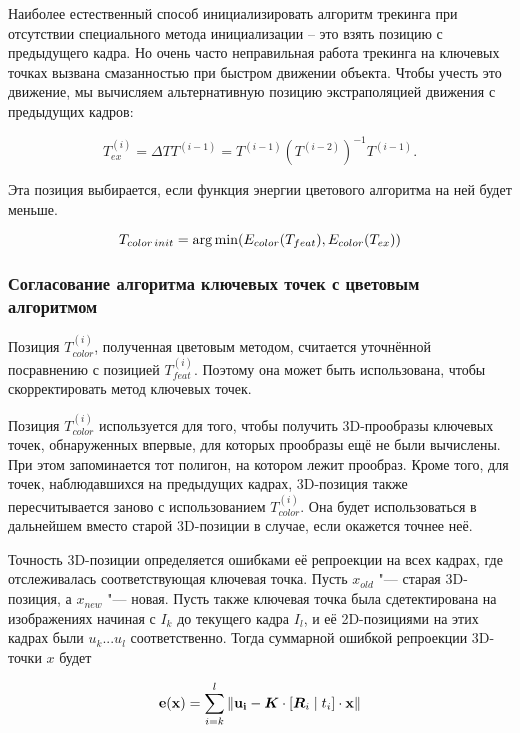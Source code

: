 Наиболее естественный способ инициализировать алгоритм трекинга при отсутствии
специального метода инициализации -- это взять позицию с предыдущего кадра.
Но очень часто неправильная работа трекинга на ключевых точках вызвана
смазанностью при быстром движении объекта.
Чтобы учесть это движение, мы вычисляем альтернативную позицию экстраполяцией
движения с предыдущих кадров:

\begin{equation}
\label{eqn:extrapolation}
T^{(i)}_{ex} = \Delta T T^{(i - 1)} = T^{(i - 1)}(T^{(i - 2)})^{-1} T^{(i -
1)}
\text{.}
\end{equation}

Эта позиция выбирается, если функция энергии цветового алгоритма на ней будет
меньше.

\begin{equation}
\label{eqn:init_selection}
    T_{color \, init} = \operatorname*{arg\,min}(E_{color}(T_{feat}), E_{color}(T_{ex}))
\end{equation}

\subsubsection*{Согласование алгоритма ключевых точек с цветовым алгоритмом}
Позиция $T_{color}^{(i)}$, полученная цветовым методом, считается уточнённой
посравнению с позицией $T_{feat}^{(i)}$.
Поэтому она может быть использована, чтобы скорректировать метод ключевых
точек.

Позиция $T_{color}^{(i)}$ используется для того, чтобы получить 3D-прообразы
ключевых точек, обнаруженных впервые, для которых прообразы ещё не были
вычислены.
При этом запоминается тот полигон, на котором лежит прообраз.
Кроме того, для точек, наблюдавшихся на предыдущих кадрах, 3D-позиция также
пересчитывается заново с использованием $T_{color}^{(i)}$.
Она будет использоваться в дальнейшем вместо старой 3D-позиции в случае, если
окажется точнее неё.

Точность 3D-позиции определяется ошибками её репроекции на всех кадрах, где
отслеживалась соответствующая ключевая точка.
Пусть $x_{old}$ "--- старая 3D-позиция, а $x_{new}$ "--- новая. 
Пусть также ключевая точка была сдетектирована на изображениях начиная с $I_k$
до текущего кадра $I_l$, и её 2D-позициями на этих кадрах были $u_k ... u_l$
соответственно.
Тогда суммарной ошибкой репроекции 3D-точки $x$ будет

\begin{equation}
\label{eqn:sum_reproj}
\mathbf{e}(\mathbf{x}) = \sum\limits_{i = k}^l \| \mathbf{u_i} - \bm{K} \cdot
[\bm{R}_i \mid \mathnormal{t}_i] \cdot \mathbf{x} \|
\end{equation}

